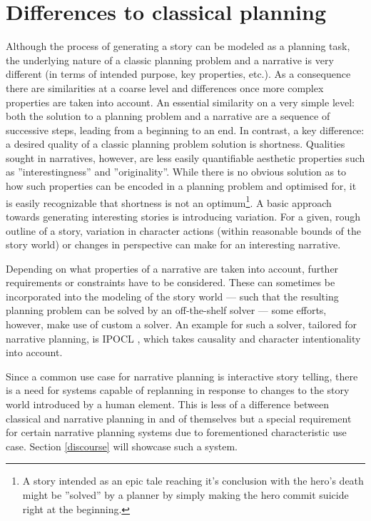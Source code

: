 \section{Differences to classical planning}\label{differences}
Although the process of generating a story can be modeled as a planning task, the underlying nature of a classic planning problem and a narrative is very different (in terms of intended purpose, key properties, etc.). As a consequence there are similarities at a coarse level and differences once more complex properties are taken into account. An essential similarity on a very simple level: both the solution to a planning problem and a narrative are a sequence of successive steps, leading from a beginning to an end. In contrast, a key difference: a desired quality of a classic planning problem solution is shortness. Qualities sought in narratives, however, are less easily quantifiable aesthetic properties such as ''interestingness'' and ''originality''. While there is no obvious solution as to how such properties can be encoded in a planning problem and optimised for, it is easily recognizable that shortness is not an optimum\footnote{A story intended as an epic tale reaching it's conclusion with the hero's death might be ''solved'' by a planner by simply making the hero commit suicide right at the beginning.}. A basic approach towards generating interesting stories is introducing variation. For a given, rough outline of a story, variation in character actions (within reasonable bounds of the story world) or changes in perspective can make for an interesting narrative.

Depending on what properties of a narrative are taken into account, further requirements or constraints have to be considered. These can sometimes be incorporated into the modeling of the story world --- such that the resulting planning problem can be solved by an off-the-shelf solver --- some efforts, however, make use of custom a solver. An example for such a solver, tailored for narrative planning, is IPOCL \cite{Riedl04}, which takes causality and character intentionality into account.

Since a common use case for narrative planning is interactive story telling, there is a need for systems capable of replanning in response to changes to the story world introduced by a human element. This is less of a difference between classical and narrative planning in and of themselves but a special requirement for certain narrative planning systems due to forementioned characteristic use case. Section \ref{discourse} will showcase such a system.
%
%
%
